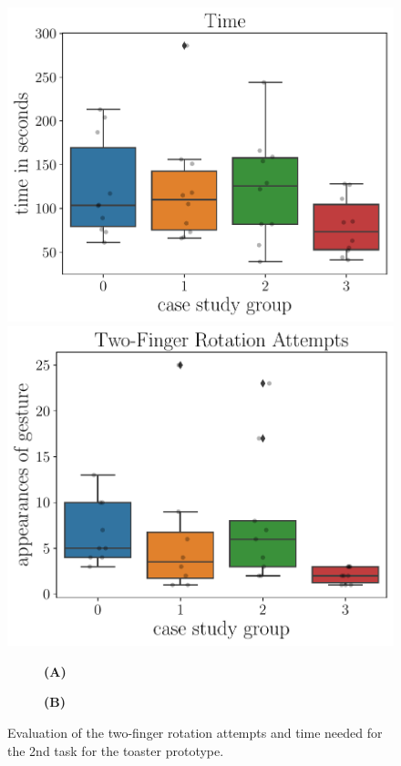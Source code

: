 \documentclass[11pt, a4paper]{article}
\begin{document}
			\begin{figure}[H]
				\centering
				\includegraphics[width=.49\textwidth]{img/plot/plot_bplot_time.pdf}
				\includegraphics[width=.49\textwidth]{img/plot/plot_bplot_tfr.pdf}
				\begin{subfigure}[t]{.49\textwidth}\centering
					\textbf{(A)}
				\end{subfigure}
				\begin{subfigure}[t]{.49\textwidth}\centering
					\textbf{(B)}
				\end{subfigure}
				\caption{Evaluation of the two-finger rotation attempts and time needed for the 2nd task for the toaster prototype.}
				\label{fig:t2_metrics}
			\end{figure}
\end{document}
